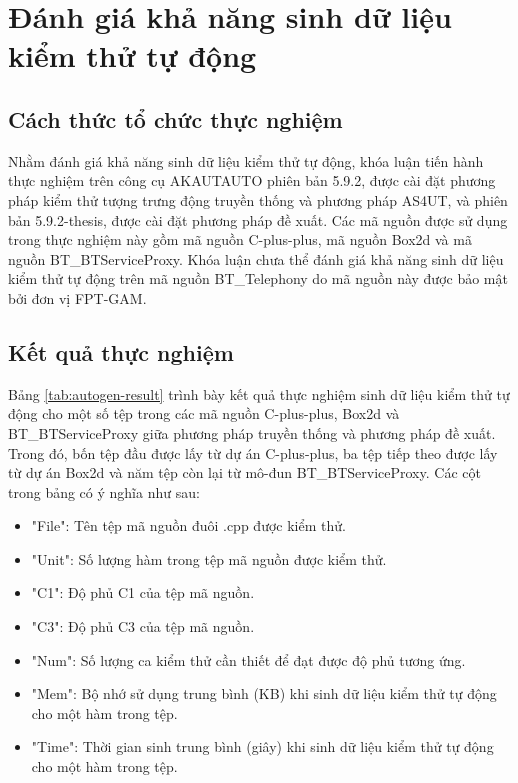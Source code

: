 \section{Đánh giá khả năng sinh dữ liệu kiểm thử tự động}
\subsection{Cách thức tổ chức thực nghiệm}
Nhằm đánh giá khả năng sinh dữ liệu kiểm thử tự động, khóa luận tiến hành thực nghiệm trên công cụ AKAUTAUTO phiên bản 5.9.2, được cài đặt phương pháp kiểm thử tượng trưng động truyền thống và phương pháp AS4UT, và phiên bản 5.9.2-thesis, được cài đặt phương pháp đề xuất. Các mã nguồn được sử dụng trong thực nghiệm này gồm mã nguồn C-plus-plus, mã nguồn Box2d và mã nguồn BT\_BTServiceProxy. Khóa luận chưa thể đánh giá khả năng sinh dữ liệu kiểm thử tự động trên mã nguồn BT\_Telephony do mã nguồn này được bảo mật bởi đơn vị FPT-GAM.

\subsection{Kết quả thực nghiệm}
Bảng \ref{tab:autogen-result} trình bày kết quả thực nghiệm sinh dữ liệu kiểm thử tự động cho một số tệp trong các mã nguồn C-plus-plus, Box2d và BT\_BTServiceProxy giữa phương pháp truyền thống và phương pháp đề xuất. Trong đó, bốn tệp đầu được lấy từ dự án C-plus-plus, ba tệp tiếp theo được lấy từ dự án Box2d và năm tệp còn lại từ mô-đun BT\_BTServiceProxy. Các cột trong bảng có ý nghĩa như sau:
\begin{itemize}
    \item "File": Tên tệp mã nguồn đuôi .cpp được kiểm thử.
    \item "Unit": Số lượng hàm trong tệp mã nguồn được kiểm thử.
    \item "C1": Độ phủ C1 của tệp mã nguồn.
    \item "C3": Độ phủ C3 của tệp mã nguồn.
    \item "Num": Số lượng ca kiểm thử cần thiết để đạt được độ phủ tương ứng.
    \item "Mem": Bộ nhớ sử dụng trung bình (KB) khi sinh dữ liệu kiểm thử tự động cho một hàm trong tệp.
    \item "Time": Thời gian sinh trung bình (giây) khi sinh dữ liệu kiểm thử tự động cho một hàm trong tệp.
\end{itemize}

